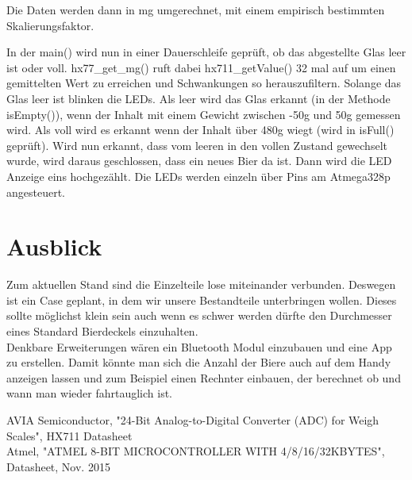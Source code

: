 \documentclass[12pt,journal,compsoc]{IEEEtran}
\begin{document}


Die Daten werden dann in mg umgerechnet, mit einem empirisch bestimmten Skalierungsfaktor.



In der main() wird nun in einer Dauerschleife geprüft, ob das abgestellte Glas leer ist oder voll.
hx77\_get\_mg() ruft dabei hx711\_getValue() 32 mal auf um einen gemittelten Wert zu erreichen
und Schwankungen so herauszufiltern. Solange das Glas leer ist blinken die LEDs. Als leer wird das
Glas erkannt (in der Methode isEmpty()), wenn der Inhalt mit einem Gewicht zwischen -50g und 50g gemessen wird.
Als voll wird es erkannt wenn der Inhalt über 480g wiegt (wird in isFull() geprüft). Wird nun erkannt,
dass vom leeren in den vollen Zustand gewechselt wurde, wird daraus geschlossen, dass ein
neues Bier da ist. Dann wird die LED Anzeige eins hochgezählt. Die LEDs werden einzeln über Pins
am Atmega328p angesteuert.

\section{Ausblick}

Zum aktuellen Stand sind die Einzelteile lose miteinander verbunden. Deswegen ist ein Case
geplant, in dem wir unsere Bestandteile unterbringen wollen. Dieses sollte möglichst klein sein
auch wenn es schwer werden dürfte den Durchmesser eines Standard Bierdeckels einzuhalten.\\
Denkbare Erweiterungen wären ein Bluetooth Modul einzubauen und eine App zu erstellen.
Damit könnte man sich die Anzahl der Biere auch auf dem Handy anzeigen lassen und zum Beispiel
einen Rechnter einbauen, der berechnet ob und wann man wieder fahrtauglich ist.



%
%
%


\begin{thebibliography}{1}

AVIA Semiconductor, "24-Bit Analog-to-Digital Converter (ADC) for Weigh Scales", HX711 Datasheet
\\
Atmel, "ATMEL 8-BIT MICROCONTROLLER WITH 4/8/16/32KBYTES", Datasheet, Nov. 2015

\end{thebibliography}
\end{document}

